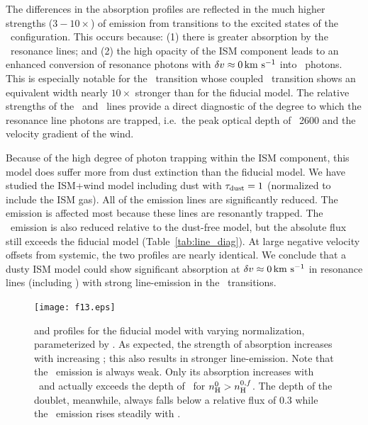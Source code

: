 \documentclass[]{emulateapj}
\begin{document}
The differences in the  absorption profiles are reflected
in the much higher strengths ($3-10\times$) of emission from
transitions to the excited states of the \aconfig\ configuration.   This occurs because:
(1) there is greater absorption by the \feiid\
resonance lines; and (2) the high opacity of the ISM component leads to
an enhanced conversion of resonance photons with $\delta v \approx 0\, {\rm km~s^{-1}}$
into \feiis\ photons.  This is especially notable for the
\feiib\ transition whose coupled \feiis\ transition shows an equivalent width nearly
$10\times$ stronger than for the fiducial model.  The relative
strengths of the \feiib\ and \feiie\ lines provide a direct
diagnostic of the degree to which the resonance line photons are
trapped, i.e.\ the peak optical depth of \ion{Fe}{2}~2600 and
the velocity gradient of the wind.

Because of the high degree of photon trapping within the ISM
component, this model does suffer more from dust extinction than the
fiducial model.  We have studied the ISM+wind model including dust
with $\tau_{\rm dust}=1$ (normalized to include the ISM gas).  All of the 
emission lines are significantly reduced.  The \ion{Mg}{2} emission is
affected most because these lines are resonantly trapped.  The \feiis\
emission is also reduced relative to the dust-free model, but the
absolute flux still exceeds the fiducial model
(Table~\ref{tab:line_diag}).  At large negative velocity offsets from
systemic, the two profiles are nearly identical.
We conclude that a dusty ISM model could show significant absorption
at $\delta v \approx 0 \, {\rm km~s^{-1}}$ in resonance lines (including
\ion{Mg}{2}) with strong line-emission in the \feiis\
transitions.

\begin{figure}[ht]
\texttt{[image: f13.eps]}
\caption{
\ion{Mg}{2} and \ion{Fe}{2} profiles for the fiducial model with
varying normalization, parameterized by \nhn.  As expected, the
strength of absorption increases with increasing \nhn; this also
results in stronger line-emission.  Note that the \feiia\ emission is
always weak. Only its absorption increases with \nhn\ and actually exceeds
the depth of \feiib\ for $n_{\rm H}^0 > n_{\rm H}^{0,f}$.  The depth of the
\ion{Mg}{2} doublet, meanwhile, always falls below a relative flux of
0.3 while the \mgiib\ emission rises steadily with \nhn.
}
\label{fig:norm}
\end{figure}
\end{document}
